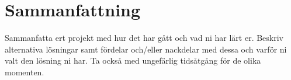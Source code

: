 \section{Sammanfattning}
Sammanfatta ert projekt med hur det har gått och vad ni har lärt er. Beskriv alternativa lösningar samt fördelar och/eller nackdelar med dessa och varför ni valt den lösning ni har. Ta också med ungefärlig tidsåtgång för de olika momenten.
